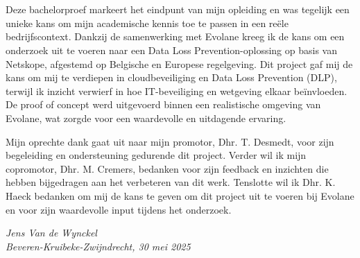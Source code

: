 
\chapter*{}%
\label{ch:voorwoord}




Deze bachelorproef markeert het eindpunt van mijn opleiding en was tegelijk een unieke kans om mijn academische kennis toe te passen in een reële bedrijfscontext.
Dankzij de samenwerking met Evolane kreeg ik de kans om een onderzoek uit te voeren naar een Data Loss Prevention-oplossing op basis van Netskope, afgestemd op Belgische en Europese regelgeving.
Dit project gaf mij de kans om mij te verdiepen in cloudbeveiliging en Data Loss Prevention (DLP), terwijl ik inzicht verwierf in hoe IT-beveiliging en wetgeving elkaar beïnvloeden.
De proof of concept werd uitgevoerd binnen een realistische omgeving van Evolane, wat zorgde voor een waardevolle en uitdagende ervaring.

Mijn oprechte dank gaat uit naar mijn promotor, Dhr. T. Desmedt, voor zijn begeleiding en ondersteuning gedurende dit project. 
Verder wil ik mijn copromotor, Dhr. M. Cremers, bedanken voor zijn feedback en inzichten die hebben bijgedragen aan het verbeteren van dit werk.
Tenslotte wil ik Dhr. K. Haeck bedanken om mij de kans te geven om dit project uit te voeren bij Evolane en voor zijn waardevolle input tijdens het onderzoek.

\vspace{1em}
\noindent
\textit{Jens Van de Wynckel} \\
\textit{Beveren-Kruibeke-Zwijndrecht, 30 mei 2025}

